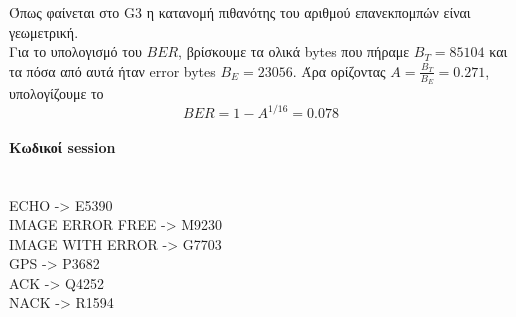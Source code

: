 \documentclass{article}
\begin{document}
Όπως φαίνεται στο G3 η κατανομή πιθανότης του αριθμού επανεκπομπών είναι
γεωμετρική.
\\
Για το υπολογισμό του $BER$, βρίσκουμε τα ολικά bytes που πήραμε $B_T = 85104$
και τα πόσα από αυτά ήταν error bytes $B_E = 23056$. Άρα ορίζοντας $A =
\frac{B_T}{B_E} = 0.271$, υπολογίζουμε το $$BER = 1 - A^{1 /16} = 0.078$$

\pagebreak
\paragraph{Κωδικοί session}\hfill\\
ECHO -> E5390\\
IMAGE ERROR FREE -> M9230\\
IMAGE WITH ERROR -> G7703\\
GPS -> P3682\\
ACK -> Q4252\\
NACK -> R1594\\
\end{document}
